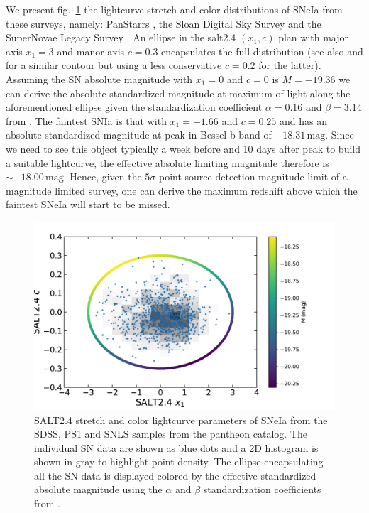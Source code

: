 \documentclass[]{aa} %
\begin{document}
We present fig.~\ref{fig:maglim} the lightcurve stretch and color distributions
of SNeIa from these surveys, namely: PanStarrs \citep[PS1][]{ref}, the Sloan
Digital Sky Survey \citep[SDSS][]{ref} and the SuperNovae Legacy Survey
\citep[SNLS][]{astier2006}.  An ellipse in the salt2.4 $(x_1, c)$ plan with
major axis $x_1=3$ and manor axis $c=0.3$ encapsulates the full distribution
(see also \citealt{bazin2011} and \citealt{campbell2013} for a similar contour
but using a less conservative $c=0.2$ for the latter). Assuming the SN absolute
magnitude with $x_1=0$ and  $c=0$ is $M=-19.36$ \citep{kessler2009,scolnic2014}
we can derive the absolute standardized magnitude at maximum of light along the
aforementioned ellipse given the standardization coefficient $\alpha=0.16$ and
$\beta=3.14$ from \cite{scolnic2018a}.  The faintest SNIa is that with
$x_1=-1.66$ and $c=0.25$ and has an absolute standardized magnitude at peak in
Bessel-b band of $-18.31\,\mathrm{mag}$. Since we need to see this object
typically a week before and 10 days after peak to build a suitable lightcurve,
the effective absolute limiting magnitude therefore is
$\sim-18.00\,\mathrm{mag}$.  Hence, given the $5\sigma$ point source detection
magnitude limit of a magnitude limited survey, one can derive the maximum
redshift above which the faintest SNeIa will start to be missed.

\begin{figure}
    \centering
    \includegraphics[width=\linewidth]{Article_figures/zmax_maglim_all.pdf}
    \caption{SALT2.4 stretch and color lightcurve parameters of SNeIa from the
        SDSS, PS1 and SNLS samples from the pantheon catalog. The individual SN
        data are shown as blue dots and a 2D histogram is shown in gray to
        highlight point density. The ellipse encapsulating all the SN data is
        displayed colored by the effective standardized absolute magnitude using
    the $\alpha$ and $\beta$ standardization coefficients from
\citep{scolnic2018a}.}
    \label{fig:maglim}
\end{figure}
\end{document}
